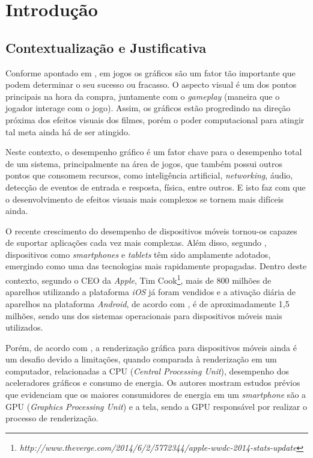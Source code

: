 \chapter[Introdução]{Introdução}
\label{introduc}

\section{Contextualização e Justificativa}

	Conforme apontado em \cite{graphicsprog}, em jogos os gráficos são um fator tão importante que podem determinar o seu sucesso ou fracasso. O aspecto visual é um dos pontos principais na hora da compra, juntamente com o \textit{gameplay} (maneira que o jogador interage com o jogo). Assim, os gráficos estão progredindo na direção próxima dos efeitos visuais dos filmes, porém o poder computacional para atingir tal meta ainda há de ser atingido.

	 Neste contexto, o desempenho gráfico é um fator chave para o desempenho total de um sistema, principalmente na área de jogos, que também possui outros pontos que consomem recursos, como inteligência artificial, \textit{networking}, áudio, detecção de eventos de entrada e resposta, física, entre outros. E isto faz com que o desenvolvimento de efeitos visuais mais complexos se tornem mais difíceis ainda.

	O recente crescimento do desempenho de dispositivos móveis tornou-os capazes de suportar aplicações cada vez mais complexas. Além disso, segundo \cite{teapot}, dispositivos como \textit{smartphones} e \textit{tablets} têm sido amplamente adotados, emergindo como uma das tecnologias mais rapidamente propagadas. Dentro deste contexto, segundo o CEO da \textit{Apple}, Tim Cook\footnote{\textit{http://www.theverge.com/2014/6/2/5772344/apple-wwdc-2014-stats-update}}, mais de 800 milhões de aparelhos utilizando a plataforma \textit{iOS} já foram vendidos e a ativação diária de aparelhos na plataforma \textit{Android}, de acordo com \cite{android2013}, é de aproximadamente 1,5 milhões, sendo uns dos sistemas operacionais para dispositivos móveis mais utilizados.

	 Porém, de acordo com \cite{x3d}, a renderização gráfica para dispositivos móveis ainda é um desafio devido a limitações, quando comparada à renderização em um computador,  relacionadas a CPU (\textit{Central Processing Unit}), desempenho dos aceleradores gráficos e consumo de energia. Os autores \cite{teapot} mostram estudos prévios que evidenciam que os maiores consumidores de energia em um \textit{smartphone} são a  GPU (\textit{Graphics Processing Unit}) e a tela, sendo a GPU responsável por realizar o processo de renderização.

